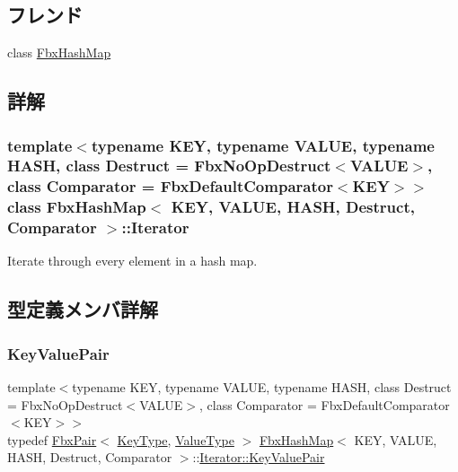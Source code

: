 \subsection*{フレンド}
\begin{DoxyCompactItemize}
\item 
class \hyperlink{class_fbx_hash_map_1_1_iterator_a58c051a31d06809f29f78fa92219181c}{Fbx\+Hash\+Map}
\end{DoxyCompactItemize}


\subsection{詳解}
\subsubsection*{template$<$typename K\+EY, typename V\+A\+L\+UE, typename H\+A\+SH, class Destruct = Fbx\+No\+Op\+Destruct$<$\+V\+A\+L\+U\+E$>$, class Comparator = Fbx\+Default\+Comparator$<$\+K\+E\+Y$>$$>$\newline
class Fbx\+Hash\+Map$<$ K\+E\+Y, V\+A\+L\+U\+E, H\+A\+S\+H, Destruct, Comparator $>$\+::\+Iterator}

Iterate through every element in a hash map. 

\subsection{型定義メンバ詳解}
\mbox{\label{class_fbx_hash_map_1_1_iterator_a2a68388bbedcb2e86a927259561fc1d4}} 
\subsubsection{\texorpdfstring{Key\+Value\+Pair}{KeyValuePair}}
{\footnotesize\ttfamily template$<$typename K\+EY, typename V\+A\+L\+UE, typename H\+A\+SH, class Destruct = Fbx\+No\+Op\+Destruct$<$\+V\+A\+L\+U\+E$>$, class Comparator = Fbx\+Default\+Comparator$<$\+K\+E\+Y$>$$>$ \\
typedef \hyperlink{class_fbx_pair}{Fbx\+Pair}$<$ \hyperlink{class_fbx_hash_map_ab56799173b6c58b676a94370b64ddbb0}{Key\+Type}, \hyperlink{class_fbx_hash_map_a9c4cfd0138aa9233c119403f3cc85501}{Value\+Type} $>$ \hyperlink{class_fbx_hash_map}{Fbx\+Hash\+Map}$<$ K\+EY, V\+A\+L\+UE, H\+A\+SH, Destruct, Comparator $>$\+::\hyperlink{class_fbx_hash_map_1_1_iterator_a2a68388bbedcb2e86a927259561fc1d4}{Iterator\+::\+Key\+Value\+Pair}}

